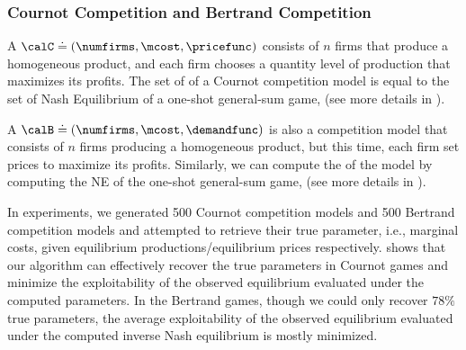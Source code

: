 \subsubsection{Cournot Competition and Bertrand Competition}

A  $\calC \doteq (\numfirms, \mcost, \pricefunc)$ consists of $n$ firms that produce a homogeneous product, and each firm chooses a quantity level of production that maximizes its profits. The set of  of a Cournot competition model is equal to the set of Nash Equilibrium of a one-shot general-sum game,  (see more details in ). 

A  $\calB \doteq (\numfirms, \mcost, \demandfunc)$ is also a competition model that consists of $n$ firms producing a homogeneous product, but this time, each firm set prices to maximize its profits. Similarly, we can compute the  of the model by computing the NE of the one-shot general-sum game,  (see more details in ). 

In experiments, we generated 500 Cournot competition models and 500 Bertrand competition models and attempted to retrieve their true parameter, i.e., marginal costs, given equilibrium productions/equilibrium prices respectively.  shows that our algorithm can effectively recover the true parameters in Cournot games and minimize the exploitability of the observed equilibrium evaluated under the computed parameters. In the Bertrand games, though we could only recover $78\%$ true parameters, the average exploitability of the observed equilibrium evaluated under the computed inverse Nash equilibrium is mostly minimized. 


